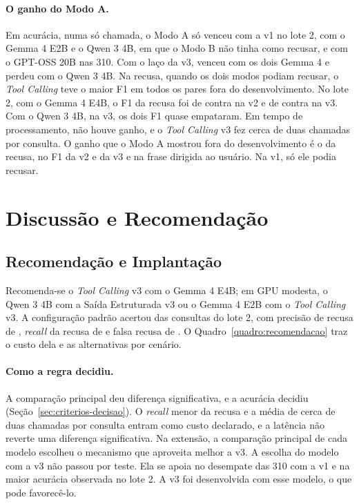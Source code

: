 \paragraph{O ganho do Modo A.} Em acurácia, numa só chamada, o Modo A só venceu com a v1 no lote 2, com o Gemma 4 E2B e o Qwen 3 4B, em que o Modo B não tinha como recusar, e com o GPT-OSS 20B nas 310. Com o laço da v3, venceu com os dois Gemma 4 e perdeu com o Qwen 3 4B. Na recusa, quando os dois modos podiam recusar, o \textit{Tool Calling} teve o maior F1 em todos os pares fora do desenvolvimento. No lote 2, com o Gemma 4 E4B, o F1 da recusa foi de  contra  na v2 e de  contra  na v3. Com o Qwen 3 4B, na v3, os dois F1 quase empataram. Em tempo de processamento, não houve ganho, e o \textit{Tool Calling} v3 fez cerca de duas chamadas por consulta. O ganho que o Modo A mostrou fora do desenvolvimento é o da recusa, no F1 da v2 e da v3 e na frase dirigida ao usuário. Na v1, só ele podia recusar.

\section{Discussão e Recomendação}
\label{sec:discussao}

\subsection{Recomendação e Implantação}
\label{sec:recomendacao}

Recomenda-se o \textit{Tool Calling} v3 com o Gemma 4 E4B; em GPU modesta, o Qwen 3 4B com a Saída Estruturada v3 ou o Gemma 4 E2B com o \textit{Tool Calling} v3. A configuração padrão acertou  das consultas do lote 2, com precisão de recusa de , \textit{recall} da recusa de  e falsa recusa de . O Quadro~\ref{quadro:recomendacao} traz o custo dela e as alternativas por cenário.

\paragraph{Como a regra decidiu.} A comparação principal deu diferença significativa, e a acurácia decidiu (Seção~\ref{sec:criterios-decisao}). O \textit{recall} menor da recusa e a média de cerca de duas chamadas por consulta entram como custo declarado, e a latência não reverte uma diferença significativa. Na extensão, a comparação principal de cada modelo escolheu o mecanismo que aproveita melhor a v3. A escolha do modelo com a v3 não passou por teste. Ela se apoia no desempate das 310 com a v1 e na maior acurácia observada no lote 2. A v3 foi desenvolvida com esse modelo, o que pode favorecê-lo.

